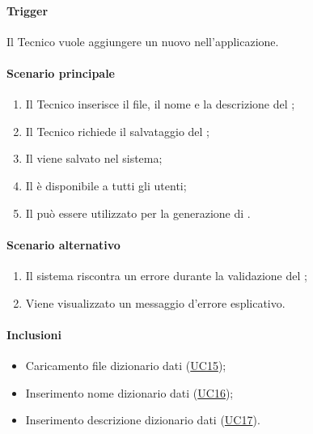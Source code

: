 \paragraph*{Trigger}
Il Tecnico vuole aggiungere un nuovo  nell'applicazione.

\paragraph*{Scenario principale}
\begin{enumerate}
  \item Il Tecnico inserisce il file, il nome e la descrizione del ;
  \item Il Tecnico richiede il salvataggio del ;
  \item Il  viene salvato nel sistema;
  \item Il  è disponibile a tutti gli utenti;
  \item Il  può essere utilizzato per la generazione di .
\end{enumerate}

\paragraph*{Scenario alternativo}
\begin{enumerate}
  \item Il sistema riscontra un errore durante la validazione del ;
  \item Viene visualizzato un messaggio d'errore esplicativo.
\end{enumerate}

\paragraph*{Inclusioni}
\begin{itemize}
  \item Caricamento file dizionario dati (\hyperref[UC15]{UC15});
  \item Inserimento nome dizionario dati (\hyperref[UC16]{UC16});
  \item Inserimento descrizione dizionario dati (\hyperref[UC17]{UC17}).
\end{itemize}

